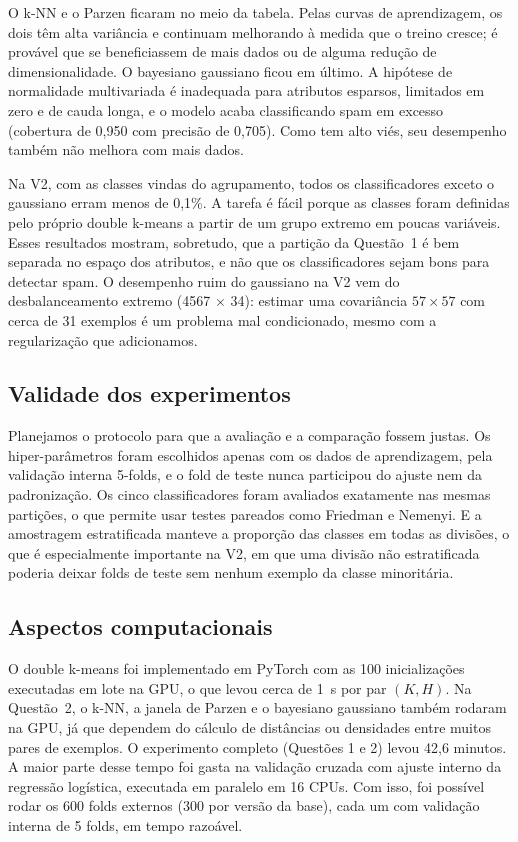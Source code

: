 \documentclass[12pt,reqno]{amsart}
\begin{document}
O k-NN e o Parzen ficaram no meio da tabela. Pelas curvas de aprendizagem, os dois têm alta
variância e continuam melhorando à medida que o treino cresce; é provável que se beneficiassem
de mais dados ou de alguma redução de dimensionalidade. O bayesiano gaussiano ficou em último. A
hipótese de normalidade multivariada é inadequada para atributos esparsos, limitados em zero e de
cauda longa, e o modelo acaba classificando spam em excesso (cobertura de 0,950 com precisão de
0,705). Como tem alto viés, seu desempenho também não melhora com mais dados.

Na V2, com as classes vindas do agrupamento, todos os classificadores exceto o gaussiano erram
menos de 0,1\%. A tarefa é fácil porque as classes foram definidas pelo próprio double k-means a
partir de um grupo extremo em poucas variáveis. Esses resultados mostram, sobretudo, que a
partição da Questão~1 é bem separada no espaço dos atributos, e não que os classificadores sejam
bons para detectar spam. O desempenho ruim do gaussiano na V2 vem do desbalanceamento extremo
(4567 $\times$ 34): estimar uma covariância $57\times57$ com cerca de 31 exemplos é um problema
mal condicionado, mesmo com a regularização que adicionamos.

\subsection*{Validade dos experimentos}
Planejamos o protocolo para que a avaliação e a comparação fossem justas. Os hiper-parâmetros
foram escolhidos apenas com os dados de aprendizagem, pela validação interna 5-folds, e o fold de
teste nunca participou do ajuste nem da padronização. Os cinco classificadores foram avaliados
exatamente nas mesmas partições, o que permite usar testes pareados como Friedman e Nemenyi. E a
amostragem estratificada manteve a proporção das classes em todas as divisões, o que é
especialmente importante na V2, em que uma divisão não estratificada poderia deixar folds de
teste sem nenhum exemplo da classe minoritária.

\subsection*{Aspectos computacionais}
O double k-means foi implementado em PyTorch com as 100 inicializações executadas em lote na
GPU, o que levou cerca de 1~s por par $(K,H)$. Na Questão~2, o k-NN, a janela de Parzen e o
bayesiano gaussiano também rodaram na GPU, já que dependem do cálculo de distâncias ou
densidades entre muitos pares de exemplos. O experimento completo (Questões 1 e 2) levou 42,6
minutos. A maior parte desse tempo foi gasta na validação cruzada com ajuste interno da regressão
logística, executada em paralelo em 16 CPUs. Com isso, foi possível rodar os 600 folds externos
(300 por versão da base), cada um com validação interna de 5 folds, em tempo razoável.
\end{document}
